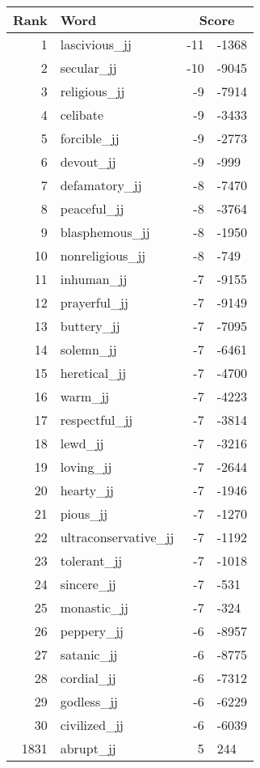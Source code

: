 \begin{longtable}[!htbp]{| rlr@{.}l |}
    \hline
    \textbf{Rank} & \textbf{Word} & \multicolumn{2}{c|}{\textbf{Score}} \\
    \hline
    \endhead
    1 & lascivious\_jj & -11 & -1368 \\
    2 & secular\_jj & -10 & -9045 \\
    3 & religious\_jj & -9 & -7914 \\
    4 & celibate & -9 & -3433 \\
    5 & forcible\_jj & -9 & -2773 \\
    6 & devout\_jj & -9 & -999 \\
    7 & defamatory\_jj & -8 & -7470 \\
    8 & peaceful\_jj & -8 & -3764 \\
    9 & blasphemous\_jj & -8 & -1950 \\
    10 & nonreligious\_jj & -8 & -749 \\
    11 & inhuman\_jj & -7 & -9155 \\
    12 & prayerful\_jj & -7 & -9149 \\
    13 & buttery\_jj & -7 & -7095 \\
    14 & solemn\_jj & -7 & -6461 \\
    15 & heretical\_jj & -7 & -4700 \\
    16 & warm\_jj & -7 & -4223 \\
    17 & respectful\_jj & -7 & -3814 \\
    18 & lewd\_jj & -7 & -3216 \\
    19 & loving\_jj & -7 & -2644 \\
    20 & hearty\_jj & -7 & -1946 \\
    21 & pious\_jj & -7 & -1270 \\
    22 & ultraconservative\_jj & -7 & -1192 \\
    23 & tolerant\_jj & -7 & -1018 \\
    24 & sincere\_jj & -7 & -531 \\
    25 & monastic\_jj & -7 & -324 \\
    26 & peppery\_jj & -6 & -8957 \\
    27 & satanic\_jj & -6 & -8775 \\
    28 & cordial\_jj & -6 & -7312 \\
    29 & godless\_jj & -6 & -6229 \\
    30 & civilized\_jj & -6 & -6039 \\
    1831 & abrupt\_jj & 5 & 244 \\

\end{longtable}
